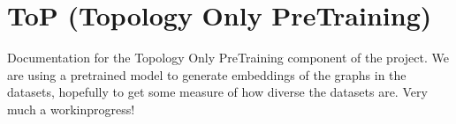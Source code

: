 \documentclass[letterpaper,10pt,english]{sphinxhowto}
\begin{document}

\begin{fulllineitems}
\label{\detokenize{datasets:datasets.get_test_datasets}}
\pysigstartsignatures
{}
\pysigstopsignatures
\end{fulllineitems}


\begin{fulllineitems}
\label{\detokenize{datasets:datasets.get_train_datasets}}
\pysigstartsignatures
{}
\pysigstopsignatures
\end{fulllineitems}


\begin{fulllineitems}
\label{\detokenize{datasets:datasets.get_val_datasets}}
\pysigstartsignatures
{}
\pysigstopsignatures
\end{fulllineitems}



\section{ToP (Topology Only Pre\sphinxhyphen{}Training)}
\label{\detokenize{index:top-topology-only-pre-training}}
\sphinxAtStartPar
Documentation for the Topology Only Pre\sphinxhyphen{}Training component of the project.
We are using a pre\sphinxhyphen{}trained model to generate embeddings of the graphs in the datasets, hopefully to get some measure of how diverse the datasets are.
Very much a work\sphinxhyphen{}in\sphinxhyphen{}progress!
\end{document}

